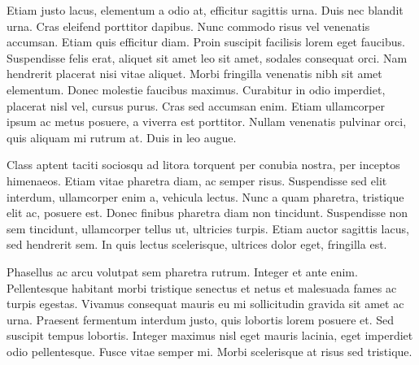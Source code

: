 Etiam justo lacus, elementum a odio at, efficitur sagittis urna. Duis nec blandit urna. Cras eleifend porttitor dapibus. Nunc commodo risus vel venenatis accumsan. Etiam quis efficitur diam. Proin suscipit facilisis lorem eget faucibus. Suspendisse felis erat, aliquet sit amet leo sit amet, sodales consequat orci. Nam hendrerit placerat nisi vitae aliquet. Morbi fringilla venenatis nibh sit amet elementum. Donec molestie faucibus maximus. Curabitur in odio imperdiet, placerat nisl vel, cursus purus. Cras sed accumsan enim. Etiam ullamcorper ipsum ac metus posuere, a viverra est porttitor. Nullam venenatis pulvinar orci, quis aliquam mi rutrum at. Duis in leo augue.

Class aptent taciti sociosqu ad litora torquent per conubia nostra, per inceptos himenaeos. Etiam vitae pharetra diam, ac semper risus. Suspendisse sed elit interdum, ullamcorper enim a, vehicula lectus. Nunc a quam pharetra, tristique elit ac, posuere est. Donec finibus pharetra diam non tincidunt. Suspendisse non sem tincidunt, ullamcorper tellus ut, ultricies turpis. Etiam auctor sagittis lacus, sed hendrerit sem. In quis lectus scelerisque, ultrices dolor eget, fringilla est.

Phasellus ac arcu volutpat sem pharetra rutrum. Integer et ante enim. Pellentesque habitant morbi tristique senectus et netus et malesuada fames ac turpis egestas. Vivamus consequat mauris eu mi sollicitudin gravida sit amet ac urna. Praesent fermentum interdum justo, quis lobortis lorem posuere et. Sed suscipit tempus lobortis. Integer maximus nisl eget mauris lacinia, eget imperdiet odio pellentesque. Fusce vitae semper mi. Morbi scelerisque at risus sed tristique. 